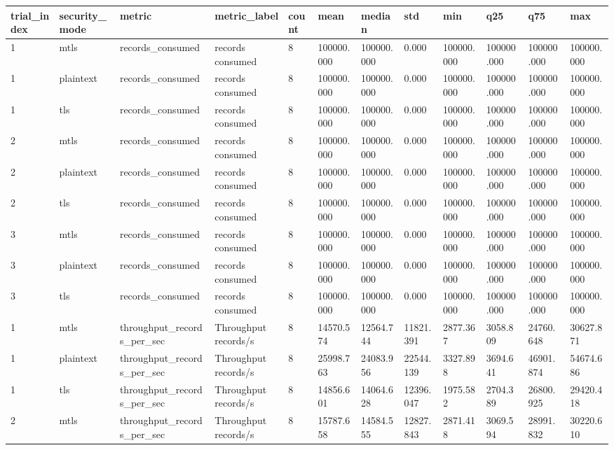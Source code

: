 \begin{longtable}{llllllllllll}
\hline
trial\_index & security\_mode & metric & metric\_label & count & mean & median & std & min & q25 & q75 & max \\
\hline
1 & mtls & records\_consumed & records consumed & 8 & 100000.000 & 100000.000 & 0.000 & 100000.000 & 100000.000 & 100000.000 & 100000.000 \\
1 & plaintext & records\_consumed & records consumed & 8 & 100000.000 & 100000.000 & 0.000 & 100000.000 & 100000.000 & 100000.000 & 100000.000 \\
1 & tls & records\_consumed & records consumed & 8 & 100000.000 & 100000.000 & 0.000 & 100000.000 & 100000.000 & 100000.000 & 100000.000 \\
2 & mtls & records\_consumed & records consumed & 8 & 100000.000 & 100000.000 & 0.000 & 100000.000 & 100000.000 & 100000.000 & 100000.000 \\
2 & plaintext & records\_consumed & records consumed & 8 & 100000.000 & 100000.000 & 0.000 & 100000.000 & 100000.000 & 100000.000 & 100000.000 \\
2 & tls & records\_consumed & records consumed & 8 & 100000.000 & 100000.000 & 0.000 & 100000.000 & 100000.000 & 100000.000 & 100000.000 \\
3 & mtls & records\_consumed & records consumed & 8 & 100000.000 & 100000.000 & 0.000 & 100000.000 & 100000.000 & 100000.000 & 100000.000 \\
3 & plaintext & records\_consumed & records consumed & 8 & 100000.000 & 100000.000 & 0.000 & 100000.000 & 100000.000 & 100000.000 & 100000.000 \\
3 & tls & records\_consumed & records consumed & 8 & 100000.000 & 100000.000 & 0.000 & 100000.000 & 100000.000 & 100000.000 & 100000.000 \\
1 & mtls & throughput\_records\_per\_sec & Throughput records/s & 8 & 14570.574 & 12564.744 & 11821.391 & 2877.367 & 3058.809 & 24760.648 & 30627.871 \\
1 & plaintext & throughput\_records\_per\_sec & Throughput records/s & 8 & 25998.763 & 24083.956 & 22544.139 & 3327.898 & 3694.641 & 46901.874 & 54674.686 \\
1 & tls & throughput\_records\_per\_sec & Throughput records/s & 8 & 14856.601 & 14064.628 & 12396.047 & 1975.582 & 2704.389 & 26800.925 & 29420.418 \\
2 & mtls & throughput\_records\_per\_sec & Throughput records/s & 8 & 15787.658 & 14584.555 & 12827.843 & 2871.418 & 3069.594 & 28991.832 & 30220.610 \\

\end{longtable}
